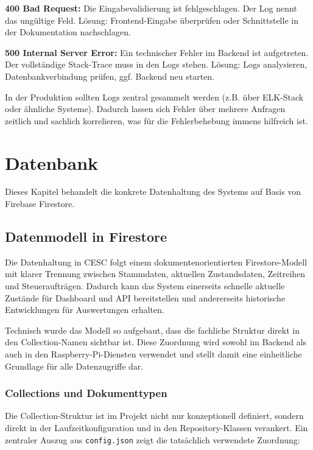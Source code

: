 \textbf{400 Bad Request:} Die Eingabevalidierung ist fehlgeschlagen. Der Log nennt das ungültige Feld. Lösung: Frontend-Eingabe überprüfen oder Schnittstelle in der Dokumentation nachschlagen.

\textbf{500 Internal Server Error:} Ein technischer Fehler im Backend ist aufgetreten. Der vollständige Stack-Trace muss in den Logs stehen. Lösung: Logs analysieren, Datenbankverbindung prüfen, ggf. Backend neu starten.

In der Produktion sollten Logs zentral gesammelt werden (z.B. über ELK-Stack oder ähnliche Systeme). Dadurch lassen sich Fehler über mehrere Anfragen zeitlich und sachlich korrelieren, was für die Fehlerbehebung immens hilfreich ist.


\section{Datenbank}

Dieses Kapitel behandelt die konkrete Datenhaltung des Systems auf Basis von Firebase Firestore.

\subsection{Datenmodell in Firestore}

Die Datenhaltung in CESC folgt einem dokumentenorientierten Firestore-Modell mit klarer Trennung zwischen Stammdaten, aktuellen Zustandsdaten, Zeitreihen und Steueraufträgen. Dadurch kann das System einerseits schnelle aktuelle Zustände für Dashboard und API bereitstellen und andererseits historische Entwicklungen für Auswertungen erhalten.

Technisch wurde das Modell so aufgebaut, dass die fachliche Struktur direkt in den Collection-Namen sichtbar ist. Diese Zuordnung wird sowohl im Backend als auch in den Raspberry-Pi-Diensten verwendet und stellt damit eine einheitliche Grundlage für alle Datenzugriffe dar.

\subsubsection{Collections und Dokumenttypen}

Die Collection-Struktur ist im Projekt nicht nur konzeptionell definiert, sondern direkt in der Laufzeitkonfiguration und in den Repository-Klassen verankert. Ein zentraler Auszug aus \texttt{config.json} zeigt die tatsächlich verwendete Zuordnung:

